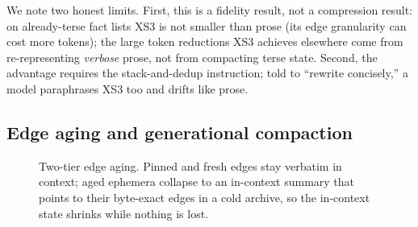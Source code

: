 \documentclass[conference]{IEEEtran}
\begin{document}
We note two honest limits. First, this is a fidelity result, not a compression
result: on already-terse fact lists XS3 is not smaller than prose (its
edge granularity can cost more tokens); the large token reductions XS3 achieves
elsewhere come from re-representing \emph{verbose} prose, not from compacting
terse state. Second, the advantage requires the stack-and-dedup instruction; told
to ``rewrite concisely,'' a model paraphrases XS3 too and drifts like prose.

\subsection{Edge aging and generational compaction}

\begin{figure}[t]
\centering
{}
\caption{Two-tier edge aging. Pinned and fresh edges stay verbatim in context; aged
ephemera collapse to an in-context summary that points to their byte-exact edges in a
cold archive, so the in-context state shrinks while nothing is lost.}
\label{fig:tier}
\end{figure}
\end{document}
